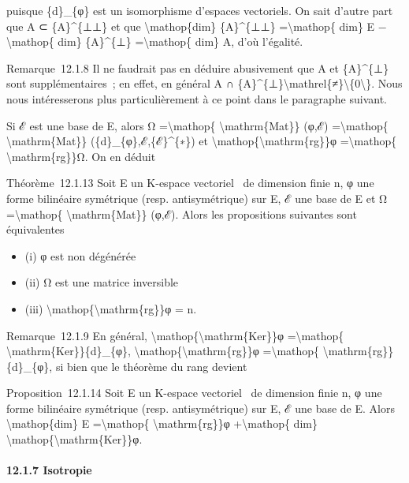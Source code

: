 \documentclass[]{article}
\begin{document}
puisque \{d\}\_\{φ\} est un isomorphisme d'espaces vectoriels. On sait
d'autre part que A ⊂ \{A\}\^{}\{⊥⊥\} et que
\textbackslash{}mathop\{dim\} \{A\}\^{}\{⊥⊥\} =\textbackslash{}mathop\{
dim\} E −\textbackslash{}mathop\{ dim\} \{A\}\^{}\{⊥\}
=\textbackslash{}mathop\{ dim\} A, d'où l'égalité.

Remarque~12.1.8 Il ne faudrait pas en déduire abusivement que A et
\{A\}\^{}\{⊥\} sont supplémentaires~; en effet, en général A ∩
\{A\}\^{}\{⊥\}\textbackslash{}mathrel\{≠\}\textbackslash{}\{0\textbackslash{}\}.
Nous nous intéresserons plus particulièrement à ce point dans le
paragraphe suivant.

Si ℰ est une base de E, alors Ω =\textbackslash{}mathop\{
\textbackslash{}mathrm\{Mat\}\} (φ,ℰ) =\textbackslash{}mathop\{
\textbackslash{}mathrm\{Mat\}\} (\{d\}\_\{φ\},ℰ,\{ℰ\}\^{}\{∗\}) et
\textbackslash{}mathop\{\textbackslash{}mathrm\{rg\}\}φ
=\textbackslash{}mathop\{ \textbackslash{}mathrm\{rg\}\}Ω. On en déduit

Théorème~12.1.13 Soit E un K-espace vectoriel ~de dimension finie n, φ
une forme bilinéaire symétrique (resp. antisymétrique) sur E, ℰ une base
de E et Ω =\textbackslash{}mathop\{ \textbackslash{}mathrm\{Mat\}\}
(φ,ℰ). Alors les propositions suivantes sont équivalentes

\begin{itemize}
\itemsep1pt\parskip0pt
\item
  (i) φ est non dégénérée
\item
  (ii) Ω est une matrice inversible
\item
  (iii) \textbackslash{}mathop\{\textbackslash{}mathrm\{rg\}\}φ = n.
\end{itemize}

Remarque~12.1.9 En général,
\textbackslash{}mathop\{\textbackslash{}mathrm\{Ker\}\}φ
=\textbackslash{}mathop\{ \textbackslash{}mathrm\{Ker\}\}\{d\}\_\{φ\},
\textbackslash{}mathop\{\textbackslash{}mathrm\{rg\}\}φ
=\textbackslash{}mathop\{ \textbackslash{}mathrm\{rg\}\}\{d\}\_\{φ\}, si
bien que le théorème du rang devient

Proposition~12.1.14 Soit E un K-espace vectoriel ~de dimension finie n,
φ une forme bilinéaire symétrique (resp. antisymétrique) sur E, ℰ une
base de E. Alors \textbackslash{}mathop\{dim\} E
=\textbackslash{}mathop\{ \textbackslash{}mathrm\{rg\}\}φ
+\textbackslash{}mathop\{ dim\}
\textbackslash{}mathop\{\textbackslash{}mathrm\{Ker\}\}φ.

\paragraph{12.1.7 Isotropie}
\end{document}
